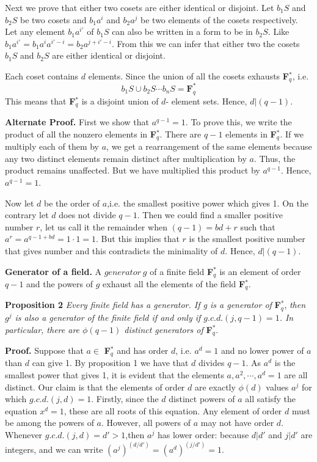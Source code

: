 \documentclass[12pt]{article}
\begin{document}
Next we prove that either two cosets are either identical or disjoint. Let $b_1S$ and $b_2S$ be two cosets and $b_1a^i$ and $b_2a^j$ be two elements of the cosets respectively. Let any element $b_1a^{i'}$ of $b_1S$ can also be written in a form to be in $b_2S$. Like $b_1a^{i'}=b_1{a^i}a^{i'-i}=b_2a^{j+i'-i}$. From this we can infer that either two the cosets $b_1S$ and $b_2S$ are either identical or disjoint.

Each coset contains $d$ elements. Since the union of all the cosets exhausts \textbf{F}$^*_q$, i.e.
$$b_1S \cup b_2S \cdots b_nS= \textbf{F}^*_q$$
This means that \textbf{F}$^*_q$ is a disjoint union of $d$- element sets. Hence, $d|(q-1)$.

\textbf{Alternate Proof.} First we show that $a^{q-1}=1$. To prove this, we write the product of all the nonzero elements in \textbf{F}$^*_q$. There are $q-1$ elements in \textbf{F}$^*_q$. If we multiply each of them by $a$, we get a rearrangement of the same elements because any two distinct elements remain distinct after multiplication by $a$. Thus, the product remains unaffected. But we have multiplied this product by $a^{q-1}$. Hence, $a^{q-1}=1$.

Now let $d$ be the order of $a$,i.e. the smallest positive power which gives 1. On the contrary let $d$ does not divide $q-1$. Then we could find a smaller positive number $r$, let us call it the remainder when $(q-1)=bd+r$ such that $a^r=a^{q-1+bd}=1\cdot1=1$. But this implies that $r$ is the smallest positive number that gives number and this contradicts the minimality of $d$. Hence, $d|(q-1)$.

\textbf{Generator of a field.} A $generator \: g$ of a finite field   \textbf{F}$^*_q$ is an element of order $q-1$ and the powers of $g$ exhaust all the elements of the field \textbf{F}$^*_q$.

\textbf{Proposition 2}
\textit{Every finite field has a generator. If g is a generator of} \textbf{F}$^*_q$, \textit{then $g^j$ is also a generator of the finite field if and only if $g.c.d.(j,q-1)=1$. In particular, there are $\phi(q-1)$ distinct generators of} \textbf{F}$^*_q$.

\textbf{Proof.}
Suppose that $a \in $ \textbf{F}$^*_q$ and has order $d$, i.e. $a^d=1$ and no lower power of $a$ than $d$ can give 1. By proposition 1 we have that $d$ divides $q-1$. As $a^d$ is the smallest power that gives 1, it is evident that the elements $a,a^2, \cdots,a^d=1$ are all distinct.
Our claim is that the elements of order $d$ are exactly $\phi(d)$ values $a^j$ for which $g.c.d.(j,d)=1$. Firstly, since the $d$ distinct powers of $a$ all satisfy the equation $x^d=1$, these are all roots of this equation. Any element of order $d$ must be among the powers of $a$. However, all powers of $a$ may not have order $d$. Whenever $g.c.d.(j,d)=d'>1$,then $a^j$ has lower order: because $d|d'$ and $j|d'$ are integers, and we can write $(a^j)^{(d/d')}=(a^d)^{(j/d')}=1$.
\end{document}
